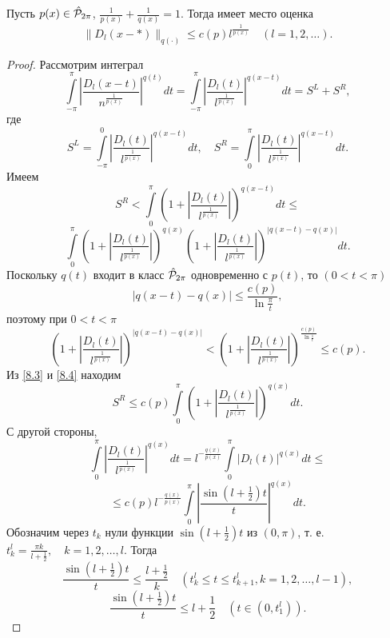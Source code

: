 \begin{lemma}\label{8.1}
 Пусть  $p(x)\in \hat {\cal P}_{2\pi}$,
$\frac{1}{p(x)}+\frac{1}{q(x)}=1$. Тогда имеет место оценка
$$
    \|D_{l}(x-*)\|_{q(\cdot)}\le c(p)l^{\frac{1}{p(x)}}\quad(l=1,2,\ldots).
$$
\end{lemma}
\begin{proof}
 Рассмотрим интеграл
\begin{equation}\label{8.2}
    \int\limits_{-\pi}^{\pi}\left|\frac{D_{l}(x-t)}{n^{\frac{1}{p(x)}}}\right|^{q(t)}dt=
    \int\limits_{-\pi}^{\pi}\left|\frac{D_{l}(t)}{l^{\frac{1}{p(x)}}}\right|^{q(x-t)}dt=S^{L}+S^{R},
\end{equation}
где
$$
    S^{L}=\int\limits_{-\pi}^{0}\left|\frac{D_{l}(t)}{l^{\frac{1}{p(x)}}}\right|^{q(x-t)}dt,
    \quad S^{R}=\int\limits_{0}^{\pi}\left|\frac{D_{l}(t)}{l^{\frac{1}{p(x)}}}\right|^{q(x-t)}dt.
$$
Имеем
$$
    S^{R}<
    \int\limits_{0}^{\pi}\left(1+\left|\frac{D_{l}(t)}{l^{\frac{1}{p(x)}}}\right|\right)^{q(x-t)}dt\leq
$$
\begin{equation}\label{8.3}
    \int\limits_{0}^{\pi}\left(1+\left|\frac{D_{l}(t)}{l^{\frac{1}{p(x)}}}\right|\right)^{q(x)}
    \left(1+\left|\frac{D_{l}(t)}{l^{\frac{1}{p(x)}}}\right|\right)^{|q(x-t)-q(x)|}dt.
\end{equation}
Поскольку $q(t)$ входит в класс $\hat{\cal P}_{2\pi}$
одновременно с $p(t)$, то $(0<t<\pi)$
$$
    |q(x-t)-q(x)|\leq \frac{c(p)}{\ln\frac\pi t},
$$
поэтому при $0<t<\pi$
\begin{equation}\label{8.4}
    \left(1+\left|\frac{D_{l}(t)}{l^{\frac{1}{p(x)}}}\right|\right)^{|q(x-t)-q(x)|}<
    \left(1+\left|\frac{D_{l}(t)}{l^{\frac{1}{p(x)}}}\right|\right)^{\frac{c(p)}{\ln\frac1t}}
    \leq c(p).
\end{equation}
Из \eqref{8.3} и \eqref{8.4} находим
\begin{equation}\label{8.5}
    S^{R}\leq c(p)\int\limits_{0}^{\pi}\left(1+\left|\frac{D_{l}(t)}{l^{\frac{1}{p(x)}}}
    \right|\right)^{q(x)}dt.
\end{equation}
С другой стороны,
$$
    \int\limits_{0}^{\pi}\left|\frac{D_{l}(t)}{l^{\frac{1}{p(x)}}}\right|^{q(x)}dt=
    l^{-\frac{q(x)}{p(x)}}\int\limits_{0}^{\pi}|D_{l}(t)|^{q(x)}dt
    \leq
$$
\begin{equation}\label{8.6}
    \leq c(p)l^{-\frac{q(x)}{p(x)}}\int\limits_{0}^{\pi}\left|\frac{\sin(l+\frac12) t}{ t}
    \right|^{q(x)}dt.
\end{equation}
Обозначим через $t_{k}$ нули функции $\sin(l+\frac12) t$ из
$(0,\pi)$, т. е. $t^{l}_{k}=\frac{\pi k}{l+\frac12},\quad k=1,2,\ldots,l$.
Тогда
\begin{equation}\label{8.7}
    \frac{\sin(l+\frac12) t}{ t}\leq\frac{l+\frac12}{k}\quad(t_{k}^{l}
    \leq t\leq t^{l}_{k+1},k=1,2,\ldots,l-1),
\end{equation}
\begin{equation}\label{8.8}
    \frac{\sin(l+\frac12) t}{ t}\leq l+\frac12\quad(t\in(0,t^{l}_{1})).
\end{equation}


\end{proof}
